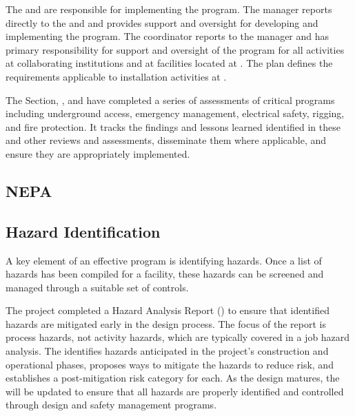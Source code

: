 The  and  are responsible for
implementing the   program.  The
  manager reports directly to the
 and  and provides
 support and oversight for developing and implementing the
  program. The  
coordinator reports to the  
manager and has primary responsibility for  support and
oversight of the   program for all activities
at collaborating institutions and at 
facilities located at . The   plan defines the 
requirements applicable to installation activities at . 

The \fnal {} Section, , and
  have completed a series of assessments of
critical   programs including underground access,
emergency management, electrical safety, rigging, and fire
protection. It tracks the findings and lessons learned identified in these
 and other reviews and assessments, 
disseminate them where applicable, and ensure they are appropriately implemented.

\subsection{NEPA}

\subsection{Hazard Identification}
\label{sec:es-tc-eshq-har}

A key element of an effective  program is identifying hazards. 
Once a list of hazards has been compiled for a facility, these hazards can be screened
and managed through a suitable set of controls.

The  project completed a Hazard Analysis Report ()
to ensure that identified hazards are mitigated early in the
design process.  The focus of the report is process hazards,
not activity hazards, which are typically covered in a job hazard
analysis.  The   identifies
hazards anticipated in the project's construction and operational
phases, proposes ways to mitigate the hazards to reduce risk, and establishes a
post-mitigation risk category for each.  As the  design 
matures, the  will be
updated to ensure that all hazards are properly identified and
controlled through design and safety management programs.

